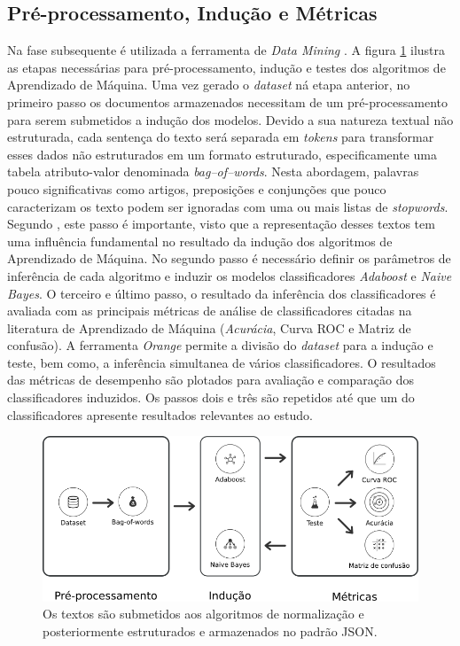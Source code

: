 \subsection{Pré-processamento, Indução e Métricas}

Na fase subsequente é utilizada a ferramenta de \textit{Data Mining} 
\cite{orange}. A figura \ref{figure:metodologia_2} ilustra as etapas 
necessárias para pré-processamento, indução e testes dos algoritmos de 
Aprendizado de Máquina. Uma vez gerado o \textit{dataset} ná etapa anterior, no 
primeiro passo os documentos armazenados necessitam de um pré-processamento 
para serem submetidos a indução dos modelos. Devido a sua natureza textual não 
estruturada, cada sentença do texto será separada em \textit{tokens} para 
transformar esses dados não estruturados em um formato estruturado, 
especificamente uma tabela atributo-valor denominada \textit{bag--of--words}. 
Nesta abordagem, palavras pouco significativas como artigos, preposições e 
conjunções que pouco caracterizam os texto podem ser ignoradas com uma ou mais 
listas de \textit{stopwords}. Segundo \cite{matsubara2003pretext}, este passo 
é importante, visto que a representação desses textos tem uma influência 
fundamental no resultado da indução dos algoritmos de Aprendizado de Máquina. 
No segundo passo é necessário definir os parâmetros de inferência de cada 
algoritmo e induzir os modelos classificadores \textit{Adaboost} e 
\textit{Naive Bayes}. O terceiro e último passo, o resultado da inferência dos 
classificadores é avaliada com as principais métricas de análise de 
classificadores citadas na literatura de Aprendizado de Máquina 
(\textit{Acurácia}, Curva ROC e Matriz de confusão). A ferramenta 
\textit{Orange} permite a divisão do \textit{dataset} para a indução e teste, 
bem como, a inferência simultanea de vários classificadores. O resultados das 
métricas de desempenho são plotados para avaliação e comparação dos 
classificadores induzidos. Os passos dois e três são repetidos até que um do 
classificadores apresente resultados relevantes ao estudo.

\begin{figure}[H]
\begin{center}
    \includegraphics[scale=0.70]{images/metodologia_2.png}
\end{center}
\caption{Os textos são submetidos aos algoritmos de normalização e posteriormente estruturados e armazenados no padrão JSON.}
\label{figure:metodologia_2}
\end{figure}

